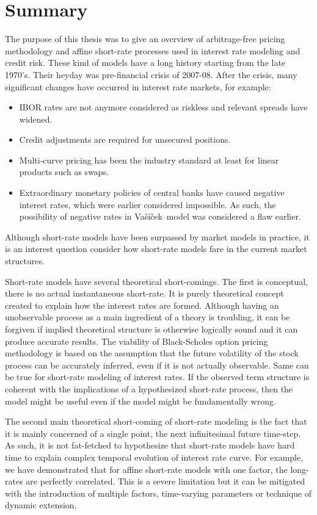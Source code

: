 \chapter{Summary}
\label{chap:conclusions}

The purpose of this thesis was to give an overview of arbitrage-free pricing methodology and affine short-rate processes used in interest rate modeling and credit risk. These kind of models have a long history starting from the late 1970's. Their heyday was pre-financial crisis of 2007-08. After the crisis, many significant changes have occurred in interest rate markets, for example:
\begin{itemize}
	\item IBOR rates are not anymore considered as riskless and relevant spreads have widened.
	\item Credit adjustments are required for unsecured positions. 
	\item Multi-curve pricing has been the industry standard at least for linear products such as swaps.
	\item Extraordinary monetary policies of central banks have caused negative interest rates, which were earlier considered impossible. As such, the possibility of negative rates in Va\v{s}\'{i}\v{c}ek--model was considered a flaw earlier.
\end{itemize}
Although short-rate models have been surpassed by market models in practice, it is an interest question consider how short-rate models fare in the current market structures.

Short-rate models have several theoretical short-comings. The first is conceptual, there is no actual instantaneous short-rate. It is purely theoretical concept created to explain how the interest rates are formed. Although having an unobservable process as a main ingredient of a theory is troubling, it can be forgiven if implied theoretical structure is otherwise logically sound and it can produce accurate results. The viability of Black-Scholes option pricing methodology is based on the assumption that the future volatility of the stock process can be accurately inferred, even if it is not actually observable. Same can be true for short-rate modeling of interest rates. If the observed term structure is coherent with the implications of a hypothesized short-rate process, then the model might be useful even if the model might be fundamentally wrong.

The second main theoretical short-coming of short-rate modeling is the fact that it is mainly concerned of a single point, the next infinitesimal future time-step. As such, it is not fat-fetched to hypothesize that short-rate models have hard time to explain complex temporal evolution of interest rate curve. For example, we have demonstrated that for affine short-rate models with one factor, the long-rates are perfectly correlated. This is a severe limitation but it can be mitigated with the introduction of multiple factors, time-varying parameters or  technique of dynamic extension. 

